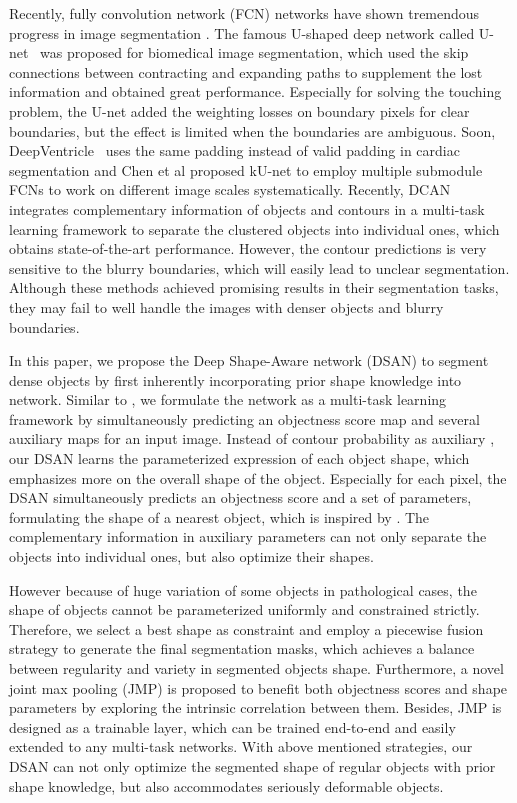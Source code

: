 Recently, fully convolution network (FCN) networks have shown tremendous progress in image segmentation \cite{Long2015a,Chen2016d,Dai2015,Zheng2015}.
The famous U-shaped deep network called U-net~\cite{Ronneberger2015} was proposed for biomedical image segmentation, which used the skip connections between contracting and expanding paths to supplement the lost information and obtained great performance.
Especially for solving the touching problem, the U-net added the weighting losses on boundary pixels for clear boundaries, but the effect is limited when the boundaries are ambiguous.
Soon, DeepVentricle~\cite{Lieman-Sifry2017} uses the same padding instead of valid padding in cardiac segmentation and Chen et al \cite{Chen2016c} proposed kU-net to employ multiple submodule FCNs to work on different image scales systematically.
Recently, DCAN~\cite{Chen2017} integrates complementary information of objects and contours in a multi-task learning framework to separate the clustered objects into individual ones, which obtains state-of-the-art performance.
However, the contour predictions is very sensitive to the blurry boundaries, which will easily lead to unclear segmentation.
Although these methods achieved promising results in their segmentation tasks, they may fail to well handle the images with denser objects and blurry boundaries.

In this paper, we propose the Deep Shape-Aware network (DSAN) to segment dense objects by first inherently incorporating prior shape knowledge into network.
Similar to \cite{Chen2017,Ren2015,Li2016a,Chen2016,Bertasius2016}, we formulate the network as a multi-task learning framework by simultaneously predicting an objectness score map and several auxiliary maps for an input image.
Instead of contour probability as auxiliary \cite{Chen2017,Chen2016,Bertasius2016}, our DSAN learns the parameterized expression of each object shape, which emphasizes more on the overall shape of the object.
Especially for each pixel, the DSAN simultaneously predicts an objectness score and a set of parameters, formulating the shape of a nearest object, which is inspired by \cite{Ren2015} .
The complementary information in auxiliary parameters can not only separate the objects into individual ones, but also optimize their shapes.

However because of huge variation of some objects in pathological cases, the shape of objects cannot be parameterized uniformly and constrained strictly.
Therefore, we select a best shape as constraint and employ a piecewise fusion strategy to generate the final segmentation masks, which achieves a balance between regularity and variety in segmented objects shape.
Furthermore, a novel joint max pooling (JMP) is proposed to benefit both objectness scores and shape parameters by exploring the intrinsic correlation between them.
Besides, JMP is designed as a trainable layer, which can be trained end-to-end and easily extended to any multi-task networks.
With above mentioned strategies, our DSAN can not only optimize the segmented shape of regular objects with prior shape knowledge, but also accommodates seriously deformable objects.

